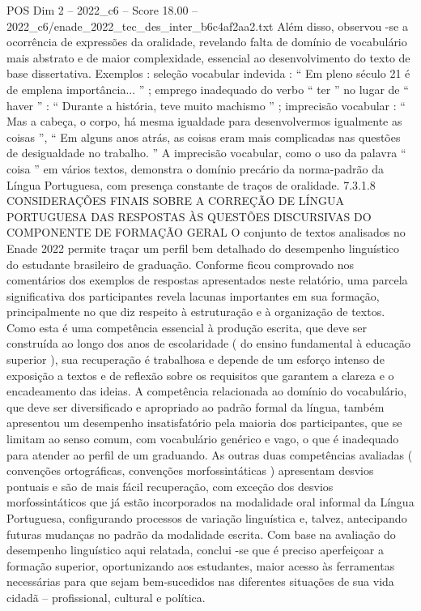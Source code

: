 \begin{textsample}{POS Dim 2 – 2022\_c6 – Score 18.00 – 2022\_c6/enade\_2022\_tec\_des\_inter\_b6c4af2aa2.txt}
Além disso, observou -se a ocorrência de expressões da oralidade, revelando falta de domínio de vocabulário mais abstrato e de maior complexidade, essencial ao desenvolvimento do texto de base dissertativa.
Exemplos : seleção vocabular indevida : “ Em pleno século 21 é de emplena importância... ” ; emprego inadequado do verbo “ ter ” no lugar de “ haver ” : “ Durante a história, teve muito machismo ” ; imprecisão vocabular : “ Mas a cabeça, o corpo, há mesma igualdade para desenvolvermos igualmente as coisas ”, “ Em alguns anos atrás, as coisas eram mais complicadas nas questões de desigualdade no trabalho. ” A imprecisão vocabular, como o uso da palavra “ coisa ” em vários textos, demonstra o domínio precário da norma-padrão da Língua Portuguesa, com presença constante de traços de oralidade. 7.3.1.8 CONSIDERAÇÕES FINAIS SOBRE A CORREÇÃO DE LÍNGUA PORTUGUESA DAS RESPOSTAS ÀS QUESTÕES DISCURSIVAS DO COMPONENTE DE FORMAÇÃO GERAL O conjunto de textos analisados no Enade 2022 permite traçar um perfil bem detalhado do desempenho linguístico do estudante brasileiro de graduação.
Conforme ficou comprovado nos comentários dos exemplos de respostas apresentados neste relatório, uma parcela significativa dos participantes revela lacunas importantes em sua formação, principalmente no que diz respeito à estruturação e à organização de textos.
Como esta é uma competência essencial à produção escrita, que deve ser construída ao longo dos anos de escolaridade ( do ensino fundamental à educação superior ), sua recuperação é trabalhosa e depende de um esforço intenso de exposição a textos e de reflexão sobre os requisitos que garantem a clareza e o encadeamento das ideias.
A competência relacionada ao domínio do vocabulário, que deve ser diversificado e apropriado ao padrão formal da língua, também apresentou um desempenho insatisfatório pela maioria dos participantes, que se limitam ao senso comum, com vocabulário genérico e vago, o que é inadequado para atender ao perfil de um graduando.
As outras duas competências avaliadas ( convenções ortográficas, convenções morfossintáticas ) apresentam desvios pontuais e são de mais fácil recuperação, com exceção dos desvios morfossintáticos que já estão incorporados na modalidade oral informal da Língua Portuguesa, configurando processos de variação linguística e, talvez, antecipando futuras mudanças no padrão da modalidade escrita.
Com base na avaliação do desempenho linguístico aqui relatada, conclui -se que é preciso aperfeiçoar a formação superior, oportunizando aos estudantes, maior acesso às ferramentas necessárias para que sejam bem-sucedidos nas diferentes situações de sua vida cidadã – profissional, cultural e política.

\end{textsample}
